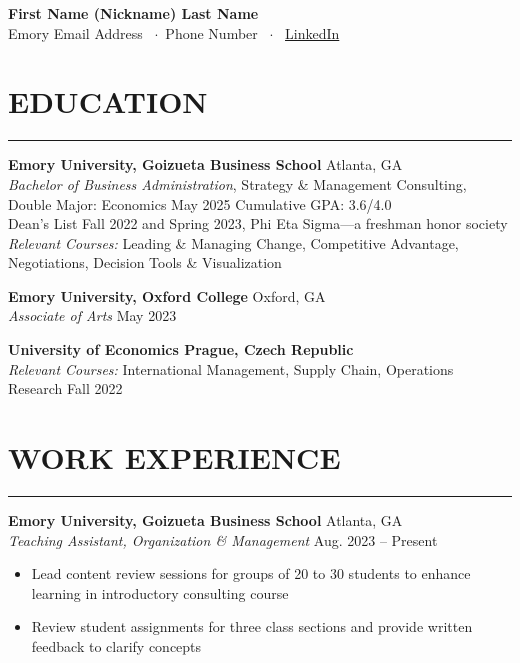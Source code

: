 \documentclass[10.5pt]{article}
\begin{document}
\noindent
\begin{center}
{\Large \textbf{\fontsize{14pt}{14pt}\selectfont First Name (Nickname) Last Name}}\\
Emory Email Address \faEnvelope~$\cdot$~Phone Number \faPhone~$\cdot$~
\href{https://www.linkedin.com/in/janehershman/}{LinkedIn \faLinkedin}
\end{center}

\section*{\large\textbf{EDUCATION}}
\vspace{-\baselineskip}
\noindent\rule{\textwidth}{0.4pt}

\noindent
\textbf{Emory University, Goizueta Business School} \hfill Atlanta, GA\\
\emph{Bachelor of Business Administration}, Strategy \& Management Consulting, 
Double Major: Economics \hfill May 2025
Cumulative GPA: 3.6/4.0 \\
Dean's List Fall 2022 and Spring 2023, Phi Eta Sigma---a freshman honor society \\
\emph{Relevant Courses:} Leading \& Managing Change, Competitive Advantage, Negotiations, Decision Tools \& Visualization

\noindent
\textbf{Emory University, Oxford College} \hfill Oxford, GA\\
\emph{Associate of Arts} \hfill May 2023

\noindent
\textbf{University of Economics Prague, Czech Republic}\\
\emph{Relevant Courses:} International Management, Supply Chain, Operations Research \hfill Fall 2022

\section*{\large\textbf{WORK EXPERIENCE}}
\vspace{-\baselineskip}
\noindent\rule{\textwidth}{0.4pt}

\noindent
\textbf{Emory University, Goizueta Business School} \hfill Atlanta, GA\\
\emph{Teaching Assistant, Organization \& Management} \hfill Aug. 2023 -- Present
\begin{itemize}[itemsep=0pt]
    \item Lead content review sessions for groups of 20 to 30 students to enhance learning in introductory consulting course
    \item Review student assignments for three class sections and provide written feedback to clarify concepts
\end{itemize}
\end{document}
